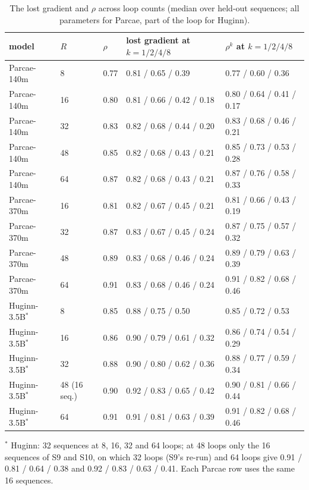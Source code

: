 \documentclass[10pt]{article}
\begin{document}
\begin{table}[!htbp]
\centering\small
\caption{The lost gradient and $\rho$ across loop counts (median over held-out sequences; all parameters for Parcae, part of the loop for Huginn).}
\begin{tabular}{lllll}
\toprule
model & $R$ & $\rho$ & lost gradient at $k = 1 / 2 / 4 / 8$ & $\rho^{k}$ at $k = 1 / 2 / 4 / 8$ \\
\midrule
Parcae-140m & 8 & 0.77 & 0.81 / 0.65 / 0.39 & 0.77 / 0.60 / 0.36 \\
Parcae-140m & 16 & 0.80 & 0.81 / 0.66 / 0.42 / 0.18 & 0.80 / 0.64 / 0.41 / 0.17 \\
Parcae-140m & 32 & 0.83 & 0.82 / 0.68 / 0.44 / 0.20 & 0.83 / 0.68 / 0.46 / 0.21 \\
Parcae-140m & 48 & 0.85 & 0.82 / 0.68 / 0.43 / 0.21 & 0.85 / 0.73 / 0.53 / 0.28 \\
Parcae-140m & 64 & 0.87 & 0.82 / 0.68 / 0.43 / 0.21 & 0.87 / 0.76 / 0.58 / 0.33 \\
Parcae-370m & 16 & 0.81 & 0.82 / 0.67 / 0.45 / 0.21 & 0.81 / 0.66 / 0.43 / 0.19 \\
Parcae-370m & 32 & 0.87 & 0.83 / 0.67 / 0.45 / 0.24 & 0.87 / 0.75 / 0.57 / 0.32 \\
Parcae-370m & 48 & 0.89 & 0.83 / 0.68 / 0.46 / 0.24 & 0.89 / 0.79 / 0.63 / 0.39 \\
Parcae-370m & 64 & 0.91 & 0.83 / 0.68 / 0.46 / 0.24 & 0.91 / 0.82 / 0.68 / 0.46 \\
Huginn-3.5B$^{*}$ & 8 & 0.85 & 0.88 / 0.75 / 0.50 & 0.85 / 0.72 / 0.53 \\
Huginn-3.5B$^{*}$ & 16 & 0.86 & 0.90 / 0.79 / 0.61 / 0.32 & 0.86 / 0.74 / 0.54 / 0.29 \\
Huginn-3.5B$^{*}$ & 32 & 0.88 & 0.90 / 0.80 / 0.62 / 0.36 & 0.88 / 0.77 / 0.59 / 0.34 \\
Huginn-3.5B$^{*}$ & 48 (16 seq.) & 0.90 & 0.92 / 0.83 / 0.65 / 0.42 & 0.90 / 0.81 / 0.66 / 0.44 \\
Huginn-3.5B$^{*}$ & 64 & 0.91 & 0.91 / 0.81 / 0.63 / 0.39 & 0.91 / 0.82 / 0.68 / 0.46 \\
\bottomrule
\end{tabular}
\par\smallskip\footnotesize\raggedright
$^{*}$ Huginn: 32 sequences at 8, 16, 32 and 64 loops; at 48 loops only the 16 sequences of S9 and S10, on which 32 loops (S9's re-run) and 64 loops give 0.91 / 0.81 / 0.64 / 0.38 and 0.92 / 0.83 / 0.63 / 0.41. Each Parcae row uses the same 16 sequences.
\label{tab:13}
\end{table}
\end{document}
